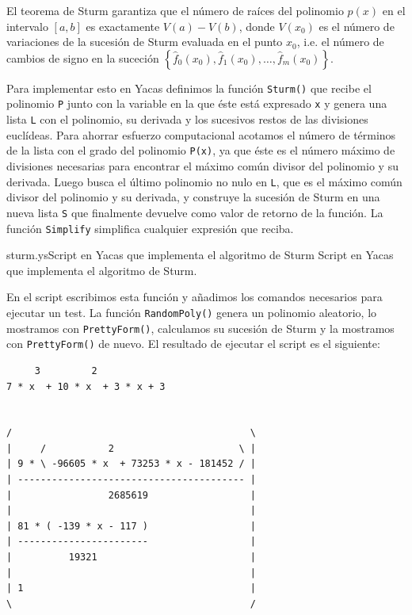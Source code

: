 El teorema  de Sturm garantiza que  el número de raíces  del polinomio
$p(x)$ en  el intervalo  $[a,b]$ es exactamente  $V(a) -  V(b)$, donde
$V(x_0)$ es el número de variaciones  de la sucesión de Sturm evaluada
en el punto $x_0$,  i.e. el número de cambios de  signo en la suceción
$\left\{   \hat{f}_0(x_0),   \hat{f}_1(x_0),  \ldots,   \hat{f}_m(x_0)
\right\}$.

Para implementar esto en Yacas definimos la función \verb+Sturm()+ que
recibe el polinomio \verb+P+ junto con la variable en la que éste está
expresado \verb+x+  y genera una  lista \verb+L+ con el  polinomio, su
derivada  y los  sucesivos restos  de las  divisiones euclídeas.  Para
ahorrar esfuerzo  computacional acotamos el  número de términos  de la
lista con el grado del polinomio \verb+P(x)+, ya que éste es el número
máximo de divisiones necesarias para encontrar el máximo común divisor
del polinomio y  su derivada. Luego busca el último  polinomio no nulo
en  \verb+L+, que  es  el  máximo común  divisor  del  polinomio y  su
derivada, y construye la sucesión de Sturm en una nueva lista \verb+S+
que  finalmente devuelve  como  valor  de retorno  de  la función.  La
función \verb+Simplify+ simplifica cualquier expresión que reciba.

\begin{ejemplo}{sturm.ys}{Script en Yacas que implementa el algoritmo de Sturm}
Script en Yacas que implementa el algoritmo de Sturm.
\end{ejemplo}

En  el  script  escribimos  esta   función  y  añadimos  los  comandos
necesarios  para  ejecutar  un test.  La  función  \verb+RandomPoly()+
genera un  polinomio aleatorio, lo mostramos  con \verb+PrettyForm()+,
calculamos su sucesión de Sturm y la mostramos con \verb+PrettyForm()+
de nuevo. El resultado de ejecutar el script es el siguiente:

\begin{verbatim}
     3         2            
7 * x  + 10 * x  + 3 * x + 3


/                                          \
|     /           2                      \ |
| 9 * \ -96605 * x  + 73253 * x - 181452 / |
| ---------------------------------------- |
|                 2685619                  |
|                                          |
| 81 * ( -139 * x - 117 )                  |
| -----------------------                  |
|          19321                           |
|                                          |
| 1                                        |
\                                          /
\end{verbatim}


